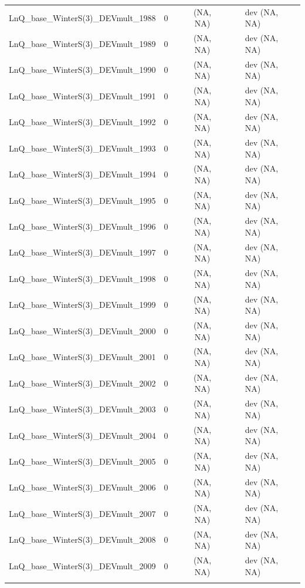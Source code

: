 \documentclass[12pt,]{article}
\begin{document}
\begin{landscape}
\begin{longtable}{lrcccll}
  LnQ\_base\_WinterS(3)\_DEVmult\_1988 & 0 &  & (NA, NA) &  &  & dev (NA, NA) \\ 
  LnQ\_base\_WinterS(3)\_DEVmult\_1989 & 0 &  & (NA, NA) &  &  & dev (NA, NA) \\ 
  LnQ\_base\_WinterS(3)\_DEVmult\_1990 & 0 &  & (NA, NA) &  &  & dev (NA, NA) \\ 
  LnQ\_base\_WinterS(3)\_DEVmult\_1991 & 0 &  & (NA, NA) &  &  & dev (NA, NA) \\ 
  LnQ\_base\_WinterS(3)\_DEVmult\_1992 & 0 &  & (NA, NA) &  &  & dev (NA, NA) \\ 
  LnQ\_base\_WinterS(3)\_DEVmult\_1993 & 0 &  & (NA, NA) &  &  & dev (NA, NA) \\ 
  LnQ\_base\_WinterS(3)\_DEVmult\_1994 & 0 &  & (NA, NA) &  &  & dev (NA, NA) \\ 
  LnQ\_base\_WinterS(3)\_DEVmult\_1995 & 0 &  & (NA, NA) &  &  & dev (NA, NA) \\ 
  LnQ\_base\_WinterS(3)\_DEVmult\_1996 & 0 &  & (NA, NA) &  &  & dev (NA, NA) \\ 
  LnQ\_base\_WinterS(3)\_DEVmult\_1997 & 0 &  & (NA, NA) &  &  & dev (NA, NA) \\ 
  LnQ\_base\_WinterS(3)\_DEVmult\_1998 & 0 &  & (NA, NA) &  &  & dev (NA, NA) \\ 
  LnQ\_base\_WinterS(3)\_DEVmult\_1999 & 0 &  & (NA, NA) &  &  & dev (NA, NA) \\ 
  LnQ\_base\_WinterS(3)\_DEVmult\_2000 & 0 &  & (NA, NA) &  &  & dev (NA, NA) \\ 
  LnQ\_base\_WinterS(3)\_DEVmult\_2001 & 0 &  & (NA, NA) &  &  & dev (NA, NA) \\ 
  LnQ\_base\_WinterS(3)\_DEVmult\_2002 & 0 &  & (NA, NA) &  &  & dev (NA, NA) \\ 
  LnQ\_base\_WinterS(3)\_DEVmult\_2003 & 0 &  & (NA, NA) &  &  & dev (NA, NA) \\ 
  LnQ\_base\_WinterS(3)\_DEVmult\_2004 & 0 &  & (NA, NA) &  &  & dev (NA, NA) \\ 
  LnQ\_base\_WinterS(3)\_DEVmult\_2005 & 0 &  & (NA, NA) &  &  & dev (NA, NA) \\ 
  LnQ\_base\_WinterS(3)\_DEVmult\_2006 & 0 &  & (NA, NA) &  &  & dev (NA, NA) \\ 
  LnQ\_base\_WinterS(3)\_DEVmult\_2007 & 0 &  & (NA, NA) &  &  & dev (NA, NA) \\ 
  LnQ\_base\_WinterS(3)\_DEVmult\_2008 & 0 &  & (NA, NA) &  &  & dev (NA, NA) \\ 
  LnQ\_base\_WinterS(3)\_DEVmult\_2009 & 0 &  & (NA, NA) &  &  & dev (NA, NA) \\ 
   \hline
\hline
\label{tab:model_params}
\end{longtable}
\end{landscape}
\end{document}
